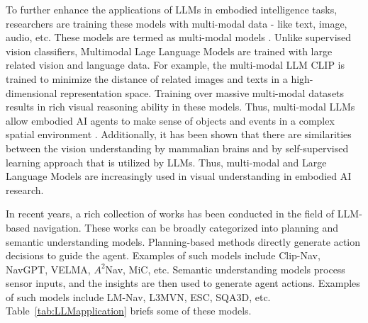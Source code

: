 To further enhance the applications of LLMs in embodied intelligence tasks, researchers are training these models with multi-modal data - like text, image, audio, etc. These models are termed as multi-modal models \cite{li2024multimodal}. Unlike supervised vision classifiers, Multimodal Lage Language Models are trained with large related vision and language data. For example, the multi-modal LLM CLIP \cite{radford2021learning} is trained to minimize the distance of related images and texts in a high-dimensional representation space. Training over massive multi-modal datasets results in rich visual reasoning ability in these models. Thus, multi-modal LLMs allow embodied AI agents to make sense of objects and events in a complex spatial environment \cite{shi2023intelligent}. Additionally, it has been shown that there are similarities between the vision understanding by mammalian brains and by self-supervised learning approach \cite{nayebi2024neural} that is utilized by LLMs. Thus, multi-modal and Large Language Models are increasingly used in visual understanding in embodied AI research. 

In recent years, a rich collection of works has been conducted in the field of LLM-based navigation. These works can be broadly categorized into planning and semantic understanding models. Planning-based methods directly generate action decisions to guide the agent. Examples of such models include Clip-Nav, NavGPT, VELMA, $A^2$Nav, MiC, etc. Semantic understanding models process sensor inputs, and the insights are then used to generate agent actions. Examples of such models include LM-Nav, L3MVN, ESC, SQA3D, etc. Table~\ref{tab:LLMapplication} briefs some of these models.

